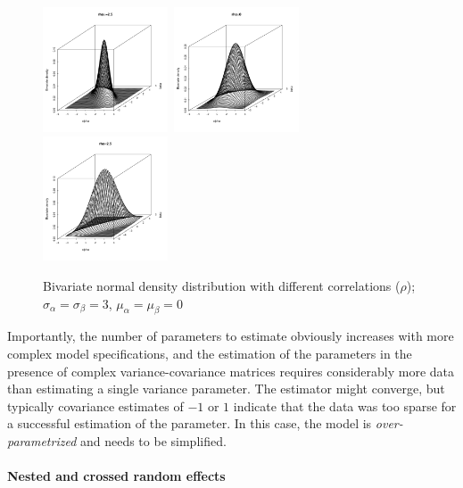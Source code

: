 \documentclass[a4paper,12pt]{article}
\begin{document}
\begin{figure}[!htpb]
  \centering
  \includegraphics[width=0.33\textwidth]{graphics/multnorm1}~\includegraphics[width=0.33\textwidth]{graphics/multnorm2}~\includegraphics[width=0.33\textwidth]{graphics/multnorm3}
  \caption{Bivariate normal density distribution with different correlations ($\rho$); $\sigma_{\alpha}=\sigma_{\beta}=3$, $\mu_{\alpha}=\mu_{\beta}=0$}
  \label{fig:multnorm}
\end{figure}

Importantly, the number of parameters to estimate obviously increases with more complex model specifications, and the estimation of the parameters in the presence of complex variance-covariance matrices requires considerably more data than estimating a single variance parameter.
The estimator might converge, but typically covariance estimates of $-1$ or $1$ indicate that the data was too sparse for a successful estimation of the parameter.
In this case, the model is \textit{over-parametrized} and needs to be simplified.

\paragraph{Nested and crossed random effects}
\end{document}
